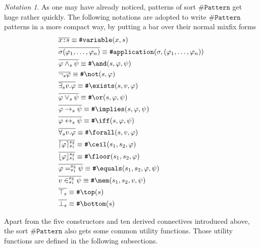 \documentclass[UTF8,11pt]{article}
\newcounter{thmcounter}
\theoremstyle{plain}
\theoremstyle{definition}
\theoremstyle{remark}
\newtheorem{notation}   [thmcounter]{Notation}
\DeclarePairedDelimiter{\ceil}{\lceil}{\rceil}
\DeclarePairedDelimiter{\floor}{\lfloor}{\rfloor}
\newcommand{\cln}{\texttt{:}}
\newcommand{\sharpsymbol}{\#}
\newcommand{\KPattern}{\texttt{\sharpsymbol Pattern}}
\newcommand{\Kvariable}{\texttt{\sharpsymbol variable}}
\newcommand{\Kand}{\texttt{\sharpsymbol  \slashsymbol and}}
\newcommand{\Kor}{\texttt{\sharpsymbol \slashsymbol  or}}
\newcommand{\Kimplies}{\texttt{\sharpsymbol  \slashsymbol implies}}
\newcommand{\Kiff}{\texttt{\sharpsymbol  \slashsymbol iff}}
\newcommand{\Knot}{\texttt{\sharpsymbol  \slashsymbol not}}
\newcommand{\Kapplication}{\texttt{\sharpsymbol application}}
\newcommand{\Kexists}{\texttt{\sharpsymbol \slashsymbol  exists}}
\newcommand{\Kforall}{\texttt{\sharpsymbol \slashsymbol  forall}}
\newcommand{\Kequals}{\texttt{\sharpsymbol \slashsymbol  equals}}
\newcommand{\Kmembership}{\texttt{\sharpsymbol \slashsymbol  mem}}
\newcommand{\Ktop}{\texttt{\sharpsymbol \slashsymbol  top}}
\newcommand{\Kbottom}{\texttt{\sharpsymbol \slashsymbol  bottom}}
\newcommand{\Kfloor}{\texttt{\sharpsymbol \slashsymbol  floor}}
\newcommand{\Kceil}{\texttt{\sharpsymbol \slashsymbol  ceil}}
\newcommand{\slashsymbol}{\symbol{92}}
\begin{document}
\begin{notation}
	As one may have already noticed, patterns of sort $\KPattern$ get huge rather quickly.
	The following notations are adopted to write $\KPattern$ patterns in a more 
	compact way, by putting a bar over their normal mixfix forms
	\begin{align*}
	  & \overline{x \cln s} \equiv \Kvariable(x, s) \\
	  & \overline{\sigma(\varphi_1, \dots, \varphi_n)} \equiv 
	  \Kapplication(\sigma, (\varphi_1, \dots, \varphi_n))
	  \\
	  & \overline{\varphi \wedge_s \psi} \equiv \Kand(s, \varphi, \psi)
	  \\
	  & \overline{\neg_s \varphi} \equiv \Knot(s, \varphi)
	  \\
	  & \overline{\exists_s v . \varphi} \equiv 
	  \Kexists(s, v, \varphi)
	  \\
	  & \overline{\varphi \vee_s \psi} \equiv \Kor(s, \varphi, \psi)
	  \\
	  & \overline{\varphi \to_s \psi} \equiv \Kimplies(s, \varphi, \psi)
	  \\
	  & \overline{\varphi \leftrightarrow_s \psi} \equiv \Kiff(s, \varphi, \psi)
	  \\
	  & \overline{\forall_s v . \varphi} \equiv \Kforall(s, v, \varphi)
      \\
      & \overline{\ceil{\varphi}_{s_1}^{s_2}} \equiv \Kceil(s_1, s_2, \varphi)
      \\
      & \overline{\floor{\varphi}_{s_1}^{s_2}} \equiv \Kfloor(s_1, s_2, \varphi)
      \\
      & \overline{\varphi =_{s_1}^{s_2} \psi} \equiv \Kequals(s_1, s_2, 
      \varphi, \psi)
      \\
      & \overline{v \in_{s_1}^{s_2} \psi} \equiv \Kmembership(s_1, s_2, v, 
      \psi)
      \\
      & \overline{\top_s} \equiv \Ktop(s)
      \\
      & \overline{\bot_s} \equiv \Kbottom(s)
	\end{align*}
\end{notation}

Apart from the five constructors and ten derived connectives introduced above, 
the sort $\KPattern$ also gets some common utility functions.
Those utility functions are defined in the following subsections.
\end{document}
